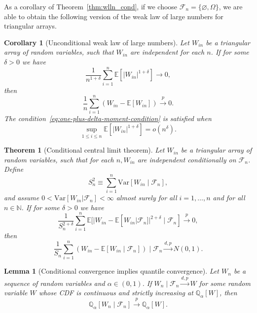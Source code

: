 \documentclass[aos]{imsart}
\newtheorem{theorem}{Theorem}
\newtheorem{lemma}{Lemma}
\newtheorem{corollary}{Corollary}
\theoremstyle{definition}
\theoremstyle{remark}
\newcommand{\E}{\mathbb E}								%
\newcommand{\V}{\mathrm{Var}}							%
\newcommand{\Q}{\mathbb{Q}}								%
\newcommand{\convp}{\overset p \rightarrow}             %
\newcommand{\convdp}{\overset {d,p} \longrightarrow}    %
\begin{document}
As a corollary of Theorem~\ref{thm:wlln_cond}, if we choose $\mathcal{F}_n=\{\varnothing,\Omega\}$, we are able to obtain the following version of the weak law of large numbers for triangular arrays.

\begin{corollary}[Unconditional weak law of large numbers] \label{cor:wlln} 
	Let $W_{in}$ be a triangular array of random variables, such that $W_{in}$ are independent for each $n$. If for some $\delta > 0$ we have
	\begin{equation}
		\frac{1}{n^{1+\delta}}\sum_{i=1}^n\E[|W_{in}|^{1+\delta}] \rightarrow 0,
		\label{eq:one-plus-delta-moment-condition}
	\end{equation}
	then 
	\begin{equation}
		\frac{1}{n} \sum_{i = 1}^n (W_{in} - \E[W_{in}]) \convp 0.
	\end{equation}
	The condition~\eqref{eq:one-plus-delta-moment-condition} is satisfied when
	\begin{equation}
		\sup_{1\leq i\leq n}\E[|W_{in}|^{1+\delta}]=o(n^{\delta}).
		\label{eq:wlln_sufficient}
	\end{equation}
\end{corollary}


\begin{theorem}[Conditional central limit theorem] \label{thm:conditional-clt} 
	Let $W_{in}$ be a triangular array of random variables, such that for each $n,W_{in}$ are independent conditionally on $\mathcal F_n$. Define
	\begin{equation}
		S_n^2 \equiv \sum_{i = 1}^n \V[W_{in} \mid \mathcal F_n],
	\end{equation} 
	and assume $0 < \mathrm{Var}[W_{in}|\mathcal{F}_n]<\infty $ almost surely for all $i=1,\ldots,n$ and for all $n\in\mathbb{N}$. If for some $\delta > 0$ we have
	\begin{equation}
		\frac{1}{S_n^{2+\delta}} \sum_{i = 1}^n \E[|W_{in}-\E[W_{in}|\mathcal{F}_n]|^{2+\delta} \mid \mathcal{F}_n] \convp 0,
		\label{eq:conditional-lyapunov}
	\end{equation}
	then 
	\begin{equation}
		\frac{1}{S_n} \sum_{i = 1}^n (W_{in} - \E[W_{in} \mid \mathcal{F}_n]) \mid \mathcal F_n \convdp N(0,1).
	\end{equation}
	
\end{theorem}

\begin{lemma}[Conditional convergence implies quantile convergence] \label{lem:conditional-convergence-to-quantile} 
	Let $W_n$ be a sequence of random variables and $\alpha \in (0,1)$. If $W_n \mid \mathcal F_n \convdp W$ for some random variable $W$ whose CDF is continuous and strictly increasing at $\mathbb Q_{\alpha}[W]$, then
	\begin{equation}
		\Q_{\alpha}[W_n \mid \mathcal F_n] \convp \Q_{\alpha}[W].
	\end{equation}
\end{lemma}
\end{document}
